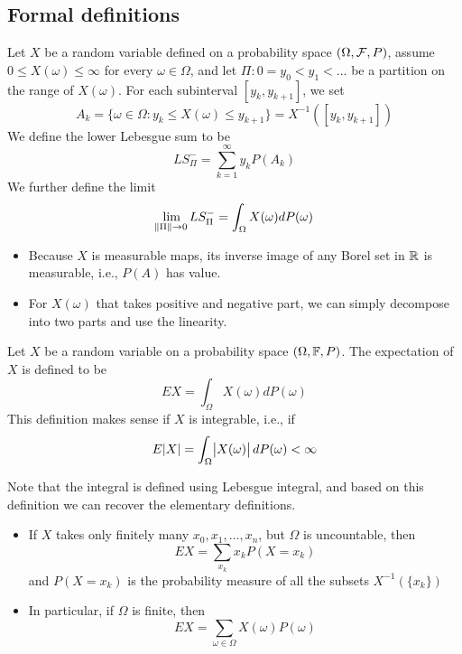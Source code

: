 \begin{refsection}
\subsection{Formal definitions}
\begin{definition}
\cite[15]{shreve2004stochastic2} Let $X$ be a random variable defined on a probability space $(\Omega,\mathcal{F},P)$, assume $0\leq X(\omega) \leq \infty$ for every $\omega \in \Omega$, and let $\Pi: 0=y_0<y_1 < ...$ be a partition on the range of $X(\omega)$. For each subinterval $[y_k,y_{k+1}]$, we set $$A_k=\{\omega \in \Omega: y_k \leq X(\omega) \leq y_{k+1}\} = X^{-1}([y_k,y_{k+1}])$$
We define the lower Lebesgue sum to be
$$LS^-_\Pi = \sum_{k=1}^\infty y_k P(A_k)$$
We further define the limit 
$$\lim_{\norm{\Pi}\to 0} LS^-_\Pi = \int_{\Omega} X(\omega)dP(\omega)$$
\end{definition}

\begin{remark}\hfill
\begin{itemize}
    \item Because $X$ is measurable maps, its inverse image of any Borel set in $\mathbb{R}$ is measurable, i.e., $P(A)$ has value. 
    \item For $X(\omega)$ that takes positive and negative part, we can simply decompose into two parts and use the linearity. 
\end{itemize}
\end{remark}

\begin{definition}[expectation]
Let $X$ be a random variable on a probability space $(\Omega, \mathbb{F},P)$. The expectation of $X$ is defined to be 
$$EX=\int_{\Omega} X(\omega)dP(\omega)$$
This definition makes sense if $X$ is integrable, i.e., if
$$E\abs{X}=\int_{\Omega} \abs{X(\omega)}dP(\omega) < \infty$$
\end{definition}

\begin{remark}
Note that the integral is defined using Lebesgue integral, and based on this definition we can recover the elementary definitions.
\begin{itemize}
    \item If $X$ takes only finitely many $x_0,x_1,...,x_n$, but $\Omega$ is uncountable, then
    $$EX=\sum_{x_k}x_kP(X=x_k)$$
    and $P(X=x_k)$ is the probability measure of all the subsets $X^{-1}(\{x_k\})$
    \item In particular, if $\Omega$ is finite, then 
    $$EX = \sum_{\omega \in \Omega} X(\omega)P(\omega)$$
\end{itemize}
\end{remark}


\end{refsection}
